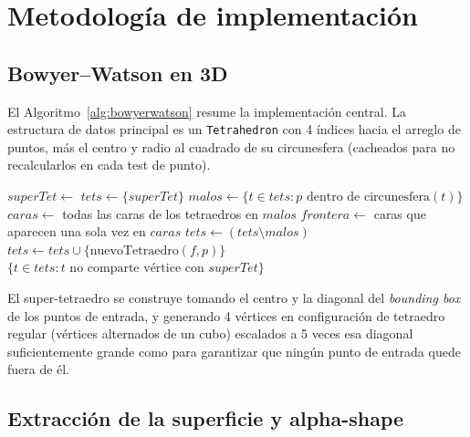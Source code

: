 \documentclass[12pt,a4paper]{article}
\begin{document}
\section{Metodología de implementación}
\label{sec:metodologia}

\subsection{Bowyer--Watson en 3D}

El Algoritmo~\ref{alg:bowyerwatson} resume la implementación central.
La estructura de datos principal es un \texttt{Tetrahedron} con 4
índices hacia el arreglo de puntos, más el centro y radio al cuadrado
de su circunesfera (cacheados para no recalcularlos en cada test de
punto).

\begin{algorithm}[H]
\caption{Bowyer--Watson 3D}
\label{alg:bowyerwatson}
\begin{algorithmic}[1]
    \State $superTet \gets$ 
    \State $tets \gets \{superTet\}$
        \State $malos \gets \{t \in tets : p \text{ dentro de circunesfera}(t)\}$
        \State $caras \gets$ todas las caras de los tetraedros en $malos$
        \State $frontera \gets$ caras que aparecen una sola vez en $caras$
        \State $tets \gets (tets \setminus malos)$
            \State $tets \gets tets \cup \{\text{nuevoTetraedro}(f, p)\}$
        \EndFor
    \EndFor
    \State \Return $\{t \in tets : t \text{ no comparte vértice con } superTet\}$
\EndProcedure
\end{algorithmic}
\end{algorithm}

El super-tetraedro se construye tomando el centro y la diagonal del
\emph{bounding box} de los puntos de entrada, y generando 4 vértices en
configuración de tetraedro regular (vértices alternados de un cubo)
escalados a 5 veces esa diagonal suficientemente grande como para
garantizar que ningún punto de entrada quede fuera de él.

\subsection{Extracción de la superficie y alpha-shape}
\end{document}
